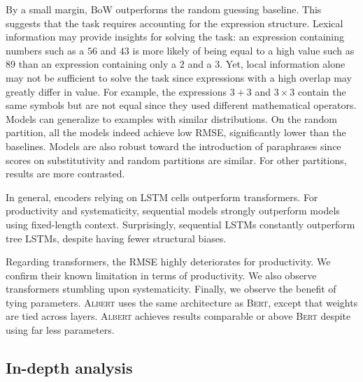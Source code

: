 By a small margin, BoW outperforms the random guessing baseline. This suggests that the task requires accounting for the expression structure. Lexical information may provide insights for solving the task: an expression containing numbers such as a $56$ and $43$ is more likely of being equal to a high value such as $89$ than an expression containing only a $2$ and a $3$. Yet, local information alone may not be sufficient to solve the task since expressions with a high overlap may greatly differ in value. For example, the expressions $3+3$ and $3\times3$ contain the same symbols but are not equal since they used different mathematical operators. 
Models can generalize to examples with similar distributions. On the random partition, all the models indeed achieve low RMSE, significantly lower than the baselines. Models are also robust toward the introduction of paraphrases since scores on substitutivity and random partitions are similar. For other partitions, results are more contrasted.

In general, encoders relying on LSTM cells outperform transformers. For productivity and systematicity, sequential models strongly outperform models using fixed-length context. Surprisingly, sequential LSTMs constantly outperform tree LSTMs, despite having fewer structural biases.

Regarding transformers, the RMSE highly deteriorates for productivity. We confirm their known limitation in terms of productivity. We also observe transformers stumbling upon systematicity. Finally, we observe the benefit of tying parameters. \textsc{Albert} uses the same architecture as \textsc{Bert}, except that weights are tied across layers. \textsc{Albert} achieves results comparable or above \textsc{Bert} despite using far less parameters.

\subsection{In-depth analysis} 


